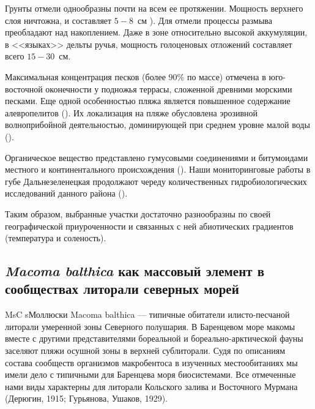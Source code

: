 Грунты отмели однообразны почти на всем ее протяжении. 
Мощность верхнего слоя ничтожна, и составляет $5 - 8$~см \cite{Prigorovskiy_1948}). 
Для отмели процессы размыва преобладают над накоплением. 
Даже в зоне относительно высокой аккумуляции, в <<языках>> дельты ручья, мощность голоценовых отложений составляет всего $15 - 30$~см.

Максимальная концентрация песков (более $90$\% по массе) отмечена в юго-восточной оконечности у подножья террасы, сложенной древними морскими песками. Еще одной особенностью пляжа является повышенное содержание алевропелитов (\cite{Pavlova_1976}). 
Их локализация на пляже обусловлена эрозивной волноприбойной деятельностью, доминирующей при среднем уровне малой воды (\cite{Alexeev_1976}).

Органическое вещество представлено гумусовыми соединениями и битумоидами местного и континентального происхождения (\cite{Gurevich_Yakovleva_1976}).
Наши мониторинговые работы в губе Дальнезеленецкая продолжают череду количественных гидробиологических исследований данного района (\cite{Prigorovskiy_1948, Matveeva_et_al_1955, Streltsov_et_al_1974, Agarova_et_al_1976, Zhukov_1984}).


Таким образом, выбранные участки достаточно разнообразны по своей географической приуроченности и связанных с ней абиотических градиентов (температура и соленость).

		\subsection{{\it Macoma balthica} как массовый элемент в сообществах литорали северных морей}

MsC
sМоллюски Macoma balthica — типичные обитатели илисто-песчаной литорали умеренной зоны Северного полушария. В Баренцевом море макомы вместе с другими представителями бореальной и бореально-арктической фауны заселяют пляжи осушной зоны в верхней сублиторали. Судя по описаниям состава сообществ организмов макробентоса в изученных местообитаниях мы имели дело с типичными для Баренцева моря биосистемами. Все отмеченные нами виды характерны для литорали Кольского залива и Восточного Мурмана (Дерюгин, 1915; Гурьянова, Ушаков, 1929).



